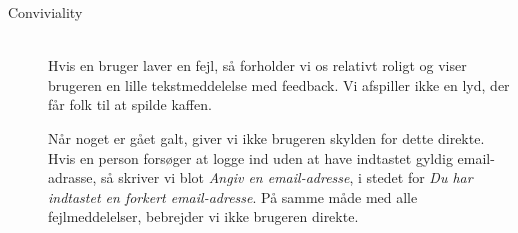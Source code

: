 \begin{description}
\item[Conviviality] \hfill \\
Hvis en bruger laver en fejl, så forholder vi os relativt roligt og viser brugeren en lille tekstmeddelelse med feedback. Vi afspiller ikke en lyd, der får folk til at spilde kaffen.

Når noget er gået galt, giver vi ikke brugeren skylden for dette direkte. Hvis en person forsøger at logge ind uden at have indtastet gyldig email-adrasse, så skriver vi blot \textit{Angiv en email-adresse}, i stedet for \textit{Du har indtastet en forkert email-adresse}. På samme måde med alle fejlmeddelelser, bebrejder vi ikke brugeren direkte.
\end{description}

